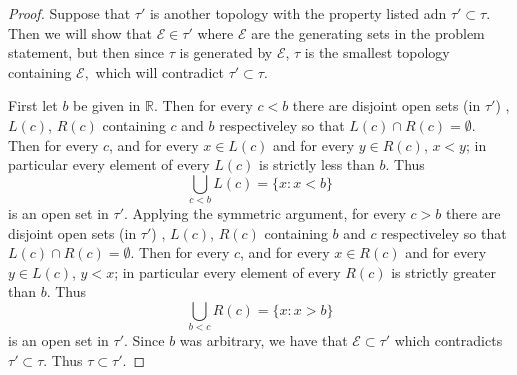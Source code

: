 \documentclass[11pt]{amsart}
\theoremstyle{definition}
\numberwithin{theorem}{section}
\numberwithin{definition}{section}
\numberwithin{equation}{section}
\def\scripte{{\mathcal E}}
\begin{document}
\begin{proof}
	Suppose that $\tau'$ is another topology with the property listed adn $\tau' \subset \tau$. Then
	we will show that $\scripte \in \tau'$ where $\scripte$ are the generating sets in the problem statement, but then
	since $\tau$ is generated by $\scripte$, $\tau$ is the smallest topology containing $\scripte,$ which will contradict $\tau' \subset \tau.$

	First let $b$ be given in $\mathbb{R}$. Then for every $c < b$ there are disjoint open sets (in $\tau'$) , $L(c)$, $R(c)$ containing $c$ and $b$ respectiveley so that $L(c) \cap R(c) = \emptyset$. Then for every $c$, and for every $x \in L(c)$ and for every $y \in R(c)$, $x <y$; in particular every element of every $L(c)$ is strictly less  than $b$. Thus
	\begin{equation*}
		\bigcup_{c < b} L(c) = \{ x : x <b\}
	\end{equation*}
	is an open set in $\tau'$. Applying the symmetric argument, for every $c > b$ there are disjoint open sets (in $\tau'$) , $L(c)$, $R(c)$ containing $b$ and $c$ respectiveley so that $L(c) \cap R(c) = \emptyset$. Then for every $c$, and for every $x \in R(c)$ and for every $y \in L(c)$, $y < x$; in particular every element of every $R(c)$ is strictly greater than $b$. Thus
	\begin{equation*}
		\bigcup_{ b < c} R(c) = \{ x : x > b\}
	\end{equation*}
	is an open set in $\tau'$. Since $b$ was arbitrary, we have that $\scripte \subset \tau'$ which contradicts $\tau' \subset \tau$. Thus $\tau \subset \tau'.$
\end{proof}
\end{document}
